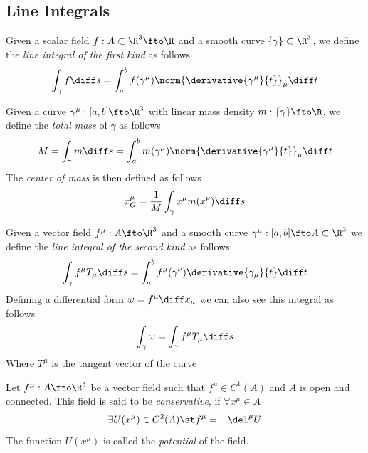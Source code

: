 \documentclass[../mmf.tex]{subfiles}
\begin{document}
\subsection{Line Integrals}
\begin{dfn}
	Given a scalar field $f:A\subset\R^3\fto\R$ and a smooth curve $\{\gamma\}\subset\R^3$, we define the \textit{line integral of the first kind} as follows
	\begin{equation}
		\int_{\gamma}^{}f\diff s=\int_{a}^{b}f(\gamma^\mu)\norm{\derivative{\gamma^\mu}{t}}_\mu\diff t
		\label{eq:lineint1R}
	\end{equation}
\end{dfn}
\begin{thm}
	Given a curve $\gamma^\mu:[a,b]\fto\R^3$ with linear mass density $m:\{\gamma\}\fto\R$, we define the \textit{total mass} of $\gamma$ as follows
	\begin{equation}
		M=\int_{\gamma}^{}m\diff s=\int_{a}^{b}m(\gamma^\mu)\norm{\derivative{\gamma^\mu}{t}}_\mu\diff t
		\label{eq:totalmasscurve}
	\end{equation}
	The \textit{center of mass} is then defined as follows
	\begin{equation}
		x_G^\mu=\frac{1}{M}\int_{\gamma}^{}x^\mu m(x^\nu)\diff s
		\label{eq:centerofmasscurve}
	\end{equation}
\end{thm}
\begin{dfn}
	Given a vector field $f^\mu:A\fto\R^3$ and a smooth curve $\gamma^\mu:[a,b]\fto A\subset\R^3$ we define the \textit{line integral of the second kind} as follows
	\begin{equation}
		\int_{\gamma}^{}f^\mu T_\mu\diff s=\int_{a}^{b}f^\mu(\gamma^\nu)\derivative{\gamma_\mu}{t}\diff t
		\label{eq:lineint2R}
	\end{equation}
	Defining a differential form $\omega=f^\mu\diff x_\mu$ we can also see this integral as follows
	\begin{equation}
		\int_{\gamma}^{}\omega=\int_{\gamma}^{}f^\mu T_\mu\diff s
		\label{eq:lineintdiffform}
	\end{equation}
	Where $T^\mu$ is the tangent vector of the curve
\end{dfn}
\begin{dfn}
	Let $f^\mu:A\fto\R^3$ be a vector field such that $f^\mu\in C^1(A)$ and $A$ is open and connected. This field is said to be \textit{conservative}, if $\forall x^\mu\in A$
	\begin{equation}
		\exists U(x^\mu)\in C^2(A)\st f^\mu=-\del^\mu U
		\label{eq:conservativefield}
	\end{equation}
	The function $U(x^\mu)$ is called the \textit{potential} of the field.\\
\end{dfn}
\end{document}
